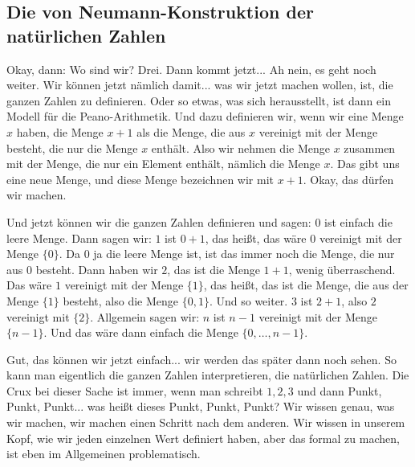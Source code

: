 \subsection{Die von Neumann-Konstruktion der natürlichen Zahlen}
\begin{spoken-clean}[continued]
Okay, dann: Wo sind wir? Drei. Dann kommt jetzt... Ah nein, es geht noch weiter. Wir können jetzt nämlich damit... was wir jetzt machen wollen, ist, die ganzen Zahlen zu definieren. Oder so etwas, was sich herausstellt, ist dann ein Modell für die Peano-Arithmetik. Und dazu definieren wir, wenn wir eine Menge $x$ haben, die Menge $x + 1$ als die Menge, die aus $x$ vereinigt mit der Menge besteht, die nur die Menge $x$ enthält. Also wir nehmen die Menge $x$ zusammen mit der Menge, die nur ein Element enthält, nämlich die Menge $x$. Das gibt uns eine neue Menge, und diese Menge bezeichnen wir mit $x + 1$. Okay, das dürfen wir machen.

Und jetzt können wir die ganzen Zahlen definieren und sagen: $0$ ist einfach die leere Menge. Dann sagen wir: $1$ ist $0 + 1$, das heißt, das wäre $0$ vereinigt mit der Menge $\{0\}$. Da $0$ ja die leere Menge ist, ist das immer noch die Menge, die nur aus $0$ besteht. Dann haben wir $2$, das ist die Menge $1 + 1$, wenig überraschend. Das wäre $1$ vereinigt mit der Menge $\{1\}$, das heißt, das ist die Menge, die aus der Menge $\{1\}$ besteht, also die Menge $\{0, 1\}$. Und so weiter. $3$ ist $2 + 1$, also $2$ vereinigt mit $\{2\}$. Allgemein sagen wir: $n$ ist $n-1$ vereinigt mit der Menge $\{n-1\}$. Und das wäre dann einfach die Menge $\{0, \dots, n-1\}$.

Gut, das können wir jetzt einfach... wir werden das später dann noch sehen. So kann man eigentlich die ganzen Zahlen interpretieren, die natürlichen Zahlen. Die Crux bei dieser Sache ist immer, wenn man schreibt $1, 2, 3$ und dann Punkt, Punkt, Punkt... was heißt dieses Punkt, Punkt, Punkt? Wir wissen genau, was wir machen, wir machen einen Schritt nach dem anderen. Wir wissen in unserem Kopf, wie wir jeden einzelnen Wert definiert haben, aber das formal zu machen, ist eben im Allgemeinen problematisch. 
\end{spoken-clean}

